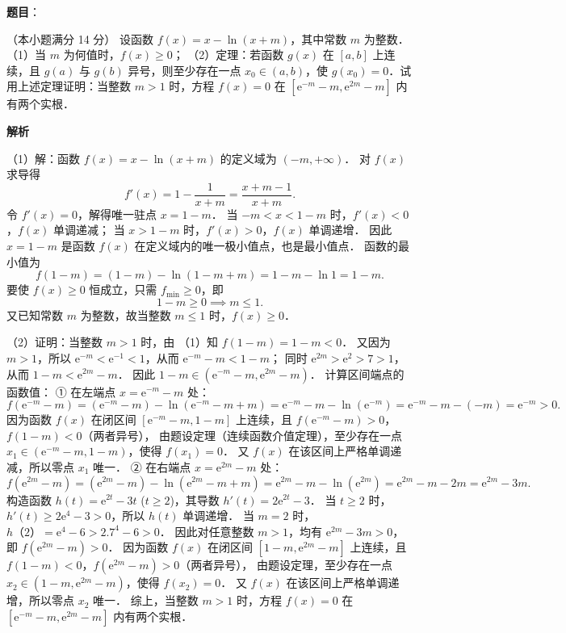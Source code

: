 \begin{answer}

\textbf{题目}：

（本小题满分 14 分）
设函数 $f(x) = x - \ln(x + m)$，其中常数 $m$ 为整数．
（1）当 $m$ 为何值时，$f(x) \geqslant 0$；
（2）定理：若函数 $g(x)$ 在 $[a, b]$ 上连续，且 $g(a)$ 与 $g(b)$ 异号，则至少存在一点 $x_0 \in (a, b)$，使 $g(x_0) = 0$．试用上述定理证明：当整数 $m > 1$ 时，方程 $f(x) = 0$ 在 $[\mathrm{e}^{-m} - m, \mathrm{e}^{2m} - m]$ 内有两个实根．

\textbf{解析}

（1）解：函数 $f(x) = x - \ln(x + m)$ 的定义域为 $(-m, +\infty)$．
对 $f(x)$ 求导得
\nopagebreak[4]
\[
f'(x) = 1 - \dfrac{1}{x + m} = \dfrac{x + m - 1}{x + m}.
\]
令 $f'(x) = 0$，解得唯一驻点 $x = 1 - m$．
当 $-m < x < 1 - m$ 时，$f'(x) < 0$，$f(x)$ 单调递减；
当 $x > 1 - m$ 时，$f'(x) > 0$，$f(x)$ 单调递增．
因此 $x = 1 - m$ 是函数 $f(x)$ 在定义域内的唯一极小值点，也是最小值点．
函数的最小值为
\nopagebreak[4]
\[
f(1 - m) = (1 - m) - \ln(1 - m + m) = 1 - m - \ln 1 = 1 - m.
\]
要使 $f(x) \geqslant 0$ 恒成立，只需 $f_{\min} \geqslant 0$，即
\nopagebreak[4]
\[
1 - m \geqslant 0 \implies m \leqslant 1.
\]
又已知常数 $m$ 为整数，故当整数 $m \leqslant 1$ 时，$f(x) \geqslant 0$．

（2）证明：当整数 $m > 1$ 时，由 （1）知 $f(1 - m) = 1 - m < 0$．
又因为 $m > 1$，所以 $\mathrm{e}^{-m} < \mathrm{e}^{-1} < 1$，从而 $\mathrm{e}^{-m} - m < 1 - m$；
同时 $\mathrm{e}^{2m} > \mathrm{e}^2 > 7 > 1$，从而 $1 - m < \mathrm{e}^{2m} - m$．
因此 $1 - m \in (\mathrm{e}^{-m} - m, \mathrm{e}^{2m} - m)$．
计算区间端点的函数值：
① 在左端点 $x = \mathrm{e}^{-m} - m$ 处：
\nopagebreak[4]
\[
f(\mathrm{e}^{-m} - m) = (\mathrm{e}^{-m} - m) - \ln(\mathrm{e}^{-m} - m + m) = \mathrm{e}^{-m} - m - \ln(\mathrm{e}^{-m}) = \mathrm{e}^{-m} - m - (-m) = \mathrm{e}^{-m} > 0.
\]
因为函数 $f(x)$ 在闭区间 $[\mathrm{e}^{-m} - m, 1 - m]$ 上连续，且 $f(\mathrm{e}^{-m} - m) > 0$，$f(1 - m) < 0$（两者异号），
由题设定理（连续函数介值定理），至少存在一点 $x_1 \in (\mathrm{e}^{-m} - m, 1 - m)$，使得 $f(x_1) = 0$．
又 $f(x)$ 在该区间上严格单调递减，所以零点 $x_1$ 唯一．
② 在右端点 $x = \mathrm{e}^{2m} - m$ 处：
\nopagebreak[4]
\[
f(\mathrm{e}^{2m} - m) = (\mathrm{e}^{2m} - m) - \ln(\mathrm{e}^{2m} - m + m) = \mathrm{e}^{2m} - m - \ln(\mathrm{e}^{2m}) = \mathrm{e}^{2m} - m - 2m = \mathrm{e}^{2m} - 3m.
\]
构造函数 $h(t) = \mathrm{e}^{2t} - 3t$ ($t \geqslant 2$)，其导数 $h'(t) = 2\mathrm{e}^{2t} - 3$．
当 $t \geqslant 2$ 时，$h'(t) \geqslant 2\mathrm{e}^4 - 3 > 0$，所以 $h(t)$ 单调递增．
当 $m = 2$ 时，$h（2）= \mathrm{e}^4 - 6 > 2.7^4 - 6 > 0$．
因此对任意整数 $m > 1$，均有 $\mathrm{e}^{2m} - 3m > 0$，即 $f(\mathrm{e}^{2m} - m) > 0$．
因为函数 $f(x)$ 在闭区间 $[1 - m, \mathrm{e}^{2m} - m]$ 上连续，且 $f(1 - m) < 0$，$f(\mathrm{e}^{2m} - m) > 0$（两者异号），
由题设定理，至少存在一点 $x_2 \in (1 - m, \mathrm{e}^{2m} - m)$，使得 $f(x_2) = 0$．
又 $f(x)$ 在该区间上严格单调递增，所以零点 $x_2$ 唯一．
综上，当整数 $m > 1$ 时，方程 $f(x) = 0$ 在 $[\mathrm{e}^{-m} - m, \mathrm{e}^{2m} - m]$ 内有两个实根．


\end{answer}

